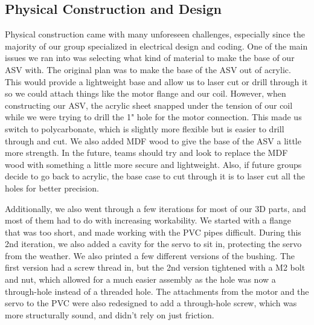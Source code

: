 \subsection{Physical Construction and Design}
Physical construction came with many unforeseen challenges, especially since the majority of our group specialized in electrical design and coding. One of the main issues we ran into was selecting what kind of material to make the base of our ASV with. The original plan was to make the base of the ASV out of acrylic. This would provide a lightweight base and allow us to laser cut or drill through it so we could attach things like the motor flange and our coil. However, when constructing our ASV, the acrylic sheet snapped under the tension of our coil while we were trying to drill the 1" hole for the motor connection. This made us switch to polycarbonate, which is slightly more flexible but is easier to drill through and cut. We also added MDF wood to give the base of the ASV a little more strength. In the future, teams should try and look to replace the MDF wood with something a little more secure and lightweight. Also, if future groups decide to go back to acrylic, the base case to cut through it is to laser cut all the holes for better precision. 

Additionally, we also went through a few iterations for most of our 3D parts, and most of them had to do with increasing workability. We started with a flange that was too short, and made working with the PVC pipes difficult. During this 2nd iteration, we also added a cavity for the servo to sit in, protecting the servo from the weather. We also printed a few different versions of the bushing. The first version had a screw thread in, but the 2nd version tightened with a M2 bolt and nut, which allowed for a much easier assembly as the hole was now a through-hole instead of a threaded hole. The attachments from the motor and the servo to the PVC were also redesigned to add a through-hole screw, which was more structurally sound, and didn't rely on just friction. 
